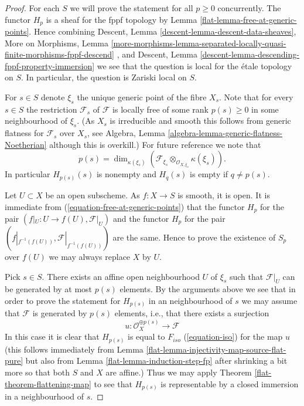 \begin{proof}

For each $S$ we will prove the statement for all $p \geq 0$ concurrently.
The functor $H_p$ is a sheaf for the fppf topology by
Lemma \ref{flat-lemma-free-at-generic-points}.
Hence combining
Descent, Lemma \ref{descent-lemma-descent-data-sheaves},
More on Morphisms, Lemma
\ref{more-morphisms-lemma-separated-locally-quasi-finite-morphisms-fppf-descend}
, and
Descent, Lemma \ref{descent-lemma-descending-fppf-property-immersion}
we see that the question is local for the \'etale topology on $S$.
In particular, the question is Zariski local on $S$.

\medskip\noindent
For $s \in S$ denote $\xi_s$ the unique generic point of the fibre $X_s$.
Note that for every $s \in S$ the restriction $\mathcal{F}_s$ of
$\mathcal{F}$ is locally free of some rank $p(s) \geq 0$ in some
neighbourhood of $\xi_s$. (As $X_s$ is irreducible
and smooth this follows from generic flatness for $\mathcal{F}_s$ over
$X_s$, see
Algebra, Lemma \ref{algebra-lemma-generic-flatness-Noetherian}
although this is overkill.) For future reference we note that
$$
p(s) =
\dim_{\kappa(\xi_s)}(
\mathcal{F}_{\xi_s} \otimes_{\mathcal{O}_{X, \xi_s}} \kappa(\xi_s)
).
$$
In particular $H_{p(s)}(s)$ is nonempty and $H_q(s)$ is empty
if $q \not = p(s)$.

\medskip\noindent
Let $U \subset X$ be an open subscheme.
As $f : X \to S$ is smooth, it is open.
It is immediate from (\ref{equation-free-at-generic-points})
that the functor $H_p$ for the pair $(f|_U : U \to f(U), \mathcal{F}|_U)$
and the functor $H_p$ for the pair
$(f|_{f^{-1}(f(U))}, \mathcal{F}|_{f^{-1}(f(U))})$
are the same. Hence to prove the existence of $S_p$ over $f(U)$ we may
always replace $X$ by $U$.

\medskip\noindent
Pick $s \in S$. There exists an affine open neighbourhood $U$
of $\xi_s$ such that $\mathcal{F}|_U$ can be generated by at most
$p(s)$ elements. By the arguments above we see that in order to prove
the statement for $H_{p(s)}$ in an neighbourhood of $s$ we may assume
that $\mathcal{F}$ is generated by $p(s)$ elements, i.e., that there exists
a surjection
$$
u : \mathcal{O}_X^{\oplus p(s)} \longrightarrow \mathcal{F}
$$
In this case it is clear that $H_{p(s)}$ is equal to $F_{iso}$
(\ref{equation-iso}) for the map $u$ (this follows immediately from
Lemma \ref{flat-lemma-injectivity-map-source-flat-pure}
but also from
Lemma \ref{flat-lemma-induction-step-fp}
after shrinking a bit more so that both $S$ and $X$ are affine.)
Thus we may apply
Theorem \ref{flat-theorem-flattening-map}
to see that $H_{p(s)}$ is representable by a closed immersion in a
neighbourhood of $s$.


\end{proof}
